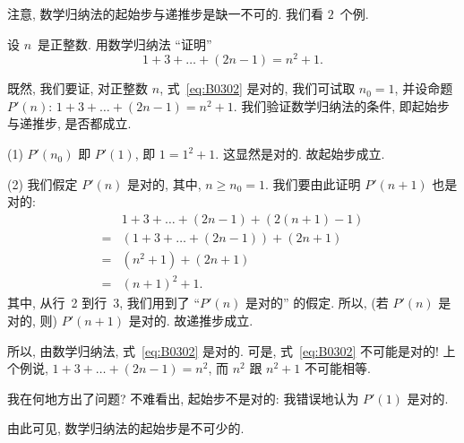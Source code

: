 \documentclass[../libro.tex]{subfiles}
\begin{document}

注意, 数学归纳法的起始步与递推步是缺一不可的.
我们看 \(2\)~个例.

\begin{example}[缺起始步]
    设 \(n\)~是正整数.
    用数学归纳法 ``证明''
    \begin{equation}
        1 + 3 + \dots + (2n - 1) = n^2 + 1.
        \label{eq:B0302}
    \end{equation}

    既然, 我们要证, 对正整数 \(n\),
    式~\eqref{eq:B0302} 是对的,
    我们可试取 \(n_0 = 1\),
    并设命题 \(P'(n)\): \(1 + 3 + \dots + (2n - 1) = n^2 + 1\).
    我们验证数学归纳法的条件,
    即起始步与递推步,
    是否都成立.

    (1)
    \(P'(n_0)\) 即 \(P'(1)\), 即 \(1 = 1^2 + 1\).
    这显然是对的.
    故起始步成立.

    (2)
    我们假定 \(P'(n)\) 是对的, 其中, \(n \geq n_0 = 1\).
    我们要由此证明 \(P'(n+1)\) 也是对的:
    \begin{align*}
        & 1 + 3 + \dots + (2n - 1) + (2(n+1) - 1)
        \\
        = {} & (1 + 3 + \dots + (2n - 1)) + (2n + 1)
        \\
        = {} & (n^2 + 1) + (2n + 1)
        \\
        = {} & (n + 1)^2 + 1.
    \end{align*}
    其中, 从行~2 到行~3,
    我们用到了 ``\(P'(n)\) 是对的'' 的假定.
    所以, (若 \(P'(n)\) 是对的, 则) \(P'(n+1)\) 是对的.
    故递推步成立.

    所以, 由数学归纳法,
    式~\eqref{eq:B0302} 是对的.
    可是, 式~\eqref{eq:B0302} 不可能是对的!
    上个例说,
    \(1 + 3 + \dots + (2n-1) = n^2\),
    而 \(n^2\) 跟 \(n^2 + 1\) 不可能相等.

    我在何地方出了问题?
    不难看出, 起始步不是对的:
    我错误地认为 \(P'(1)\) 是对的.

    由此可见, 数学归纳法的起始步是不可少的.
\end{example}
\end{document}
